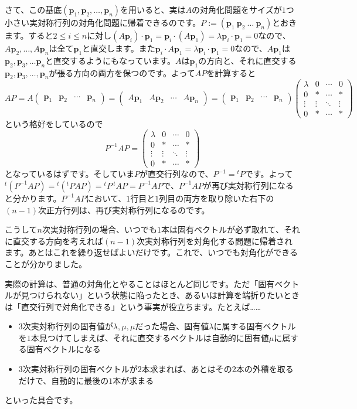 さて、この基底$(\bm{p}_1, \bm{p}_2, \ldots, \bm{p}_n)$を用いると、実は$A$の対角化問題をサイズが$1$つ小さい実対称行列の対角化問題に帰着できるのです。$P := ( \bm{p}_1 \ \bm{p}_2 \  \ldots \ \bm{p}_n )$とおきます。すると$2 \leq i \leq n$に対し$(A\bm{p}_i) \cdot \bm{p}_1 = \bm{p}_i \cdot (A\bm{p}_1) = \lambda \bm{p}_i \cdot \bm{p}_1 = 0$なので、$A\bm{p}_2, \ldots, A\bm{p}_n$は全て$\bm{p}_1$と直交します。また$\bm{p}_i \cdot A\bm{p}_1 = \lambda \bm{p}_i \cdot \bm{p}_1 = 0$なので、$A\bm{p}_1$は$\bm{p}_2, \bm{p}_3, \ldots \bm{p}_n$と直交するようにもなっています。$A$は$\bm{p}_1$の方向と、それに直交する$\bm{p}_2, \bm{p}_3, \ldots, \bm{p}_n$が張る方向の両方を保つのです。よって$AP$を計算すると
\[
AP = 
A
\begin{pmatrix}
\bm{p}_1 & \bm{p}_2 & \cdots & \bm{p}_n
\end{pmatrix}
=
\begin{pmatrix}
A\bm{p}_1 & A\bm{p}_2 & \cdots & A\bm{p}_n
\end{pmatrix}
=
\begin{pmatrix}
\bm{p}_1 & \bm{p}_2 & \cdots & \bm{p}_n
\end{pmatrix}
\begin{pmatrix}
\lambda & 0 & \cdots & 0 \\
0 & * & \cdots & * \\
\vdots & \vdots & \ddots & \vdots \\
0 & * & \cdots & *
\end{pmatrix}
\]
という格好をしているので
\[
P^{-1} A P = 
\begin{pmatrix}
\lambda & 0 & \cdots & 0 \\
0 & * & \cdots & * \\
\vdots & \vdots & \ddots & \vdots \\
0 & * & \cdots & *
\end{pmatrix}
\]
となっているはずです。そしていま$P$が直交行列なので、$P^{-1} = {}^tP$です。よって${}^t(P^{-1} A P) = {}^t({}^tP A P ) = {}^tP \, {}^t\!A P = P^{-1} A P$で、$P^{-1} A P$が再び実対称行列になると分かります。$P^{-1} A P$において、$1$行目と$1$列目の両方を取り除いた右下の$(n - 1)$次正方行列は、再び実対称行列になるのです。

こうして$n$次実対称行列の場合、いつでも$1$本は固有ベクトルが必ず取れて、それに直交する方向を考えれば$(n - 1)$次実対称行列を対角化する問題に帰着されます。あとはこれを繰り返せばよいだけです。これで、いつでも対角化ができることが分かりました。

実際の計算は、普通の対角化とやることはほとんど同じです。ただ「固有ベクトルが見つけられない」という状態に陥ったとき、あるいは計算を端折りたいときは「直交行列で対角化できる」という事実が役立ちます。たとえば……
\begin{itemize}
\item $3$次実対称行列の固有値が$\lambda, \mu, \mu$だった場合、固有値$\lambda$に属する固有ベクトルを$1$本見つけてしまえば、それに直交するベクトルは自動的に固有値$\mu$に属する固有ベクトルになる
\item $3$次実対称行列の固有ベクトルが$2$本求まれば、あとはその$2$本の外積を取るだけで、自動的に最後の$1$本が求まる
\end{itemize}
といった具合です。

